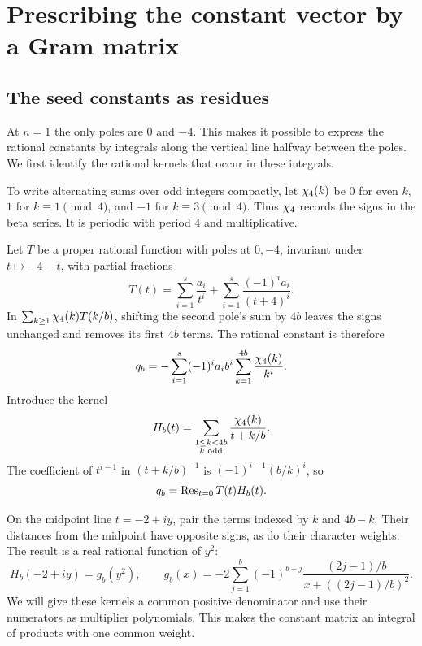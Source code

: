\section{Prescribing the constant vector by a Gram matrix}\label{sec:gram}

\subsection{The seed constants as residues}

At $n=1$ the only poles are $0$ and $-4$. This makes it possible
to express the rational constants by integrals along the vertical
line halfway between the poles. We first identify the rational
kernels that occur in these integrals.

To write alternating sums over odd integers compactly, let $\chi_4(k)$
be $0$ for even $k$, $1$ for $k\equiv1\pmod4$, and $-1$ for
$k\equiv3\pmod4$. Thus $\chi_4$ records the signs in the beta series.
It is periodic with period $4$ and multiplicative.

Let $T$ be a proper rational function with poles at $0,-4$, invariant
under $t\mapsto-4-t$, with partial fractions
\[
 T(t)=\sum_{i=1}^s\frac{a_i}{t^i}
         +\sum_{i=1}^s\frac{(-1)^ia_i}{(t+4)^i}.
\]
In $\sum_{k\ge1}\chi_4(k)T(k/b)$, shifting the second pole's sum
by $4b$ leaves the signs unchanged and removes its first $4b$
terms. The rational constant is therefore
\[
 q_b=-\sum_{i=1}^s(-1)^ia_ib^i
                           \sum_{k=1}^{4b}\frac{\chi_4(k)}{k^i}.
\]
Introduce the kernel
\[
 H_b(t)=\sum_{\substack{1\le k<4b\\k\text{ odd}}}
                         \frac{\chi_4(k)}{t+k/b}.
\]
The coefficient of $t^{i-1}$ in $(t+k/b)^{-1}$ is
$(-1)^{i-1}(b/k)^i$, so
\begin{equation}\label{eq:residue-constant}
 q_b=\operatorname{Res}_{t=0}T(t)H_b(t).
\end{equation}

On the midpoint line $t=-2+iy$, pair the terms indexed by $k$
and $4b-k$. Their distances from the midpoint have opposite signs,
as do their character weights. The result is a real rational
function of $y^2$:
\begin{equation}\label{eq:gb}
 H_b(-2+iy)=g_b(y^2),\qquad
 g_b(x)=-2\sum_{j=1}^b(-1)^{b-j}
                  \frac{(2j-1)/b}{x+((2j-1)/b)^2}.
\end{equation}
We will give these kernels a common positive denominator and use
their numerators as multiplier polynomials. This makes the constant
matrix an integral of products with one common weight.

